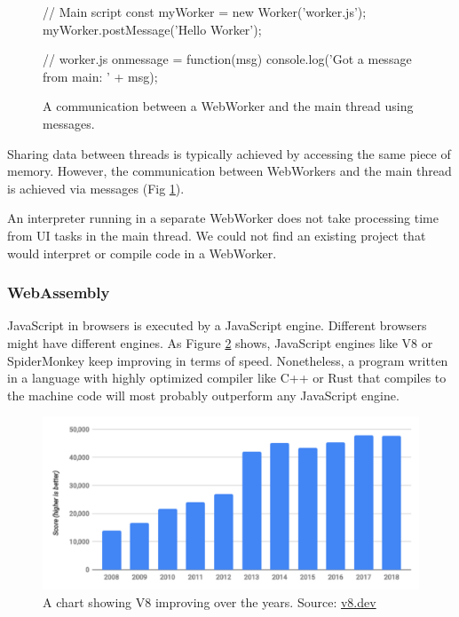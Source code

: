 \begin{figure}[hbt]
\begin{code}
// Main script
const myWorker = new Worker('worker.js');
myWorker.postMessage('Hello Worker');

// worker.js
onmessage = function(msg) {
    console.log('Got a message from main: ' + msg);
}
\end{code}
    \caption{A communication between a WebWorker and the main thread using messages.}
    \label{fig:chap2:messages}
\end{figure}

Sharing data between threads is typically achieved by accessing the same piece of memory. However, the communication between WebWorkers and the main
thread is achieved via messages (Fig \ref{fig:chap2:messages}).

An interpreter running in a separate WebWorker does not take processing time from UI tasks in the main thread. We could not find an existing
project that would interpret or compile code in a WebWorker.

\subsubsection{WebAssembly}
JavaScript in browsers is executed by a JavaScript engine. Different browsers might have different engines. As Figure \ref{fig:chap2:v8_bench} shows,
JavaScript engines like V8 or SpiderMonkey keep improving in terms of speed. Nonetheless, a program written in a language
with highly optimized compiler like C++ or Rust that compiles to the machine code will most probably outperform any JavaScript engine.

\begin{figure}[!hbt]
	\includegraphics[width=\textwidth]{../img/v8-bench}
	\caption{A chart showing V8 improving over the years. Source: \href{https://v8.dev/blog/10-years}{v8.dev}}
	\label{fig:chap2:v8_bench}
\end{figure}

